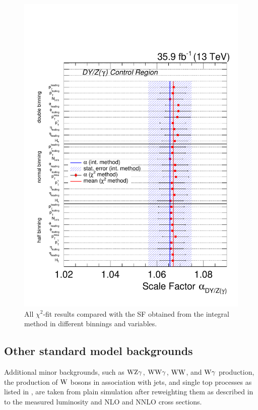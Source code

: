 \begin{figure}[tbp]
 \centering
 \includegraphics[width=\pairwidth]{figures/plots_CR/chi/DY_CompareLL}
 \caption{All $\chi^2$-fit results compared with the SF obtained from the integral method in different binnings and variables.}
 \label{fig:chiDY}
\end{figure}



\subsection{Other standard model backgrounds}
Additional minor backgrounds, such as $\mathrm{W}\mathrm{Z}\gamma$, $\mathrm{W}\mathrm{W}\gamma$, $\mathrm{W}\mathrm{W}$, and $\mathrm{W}\gamma$ production, the production of $\mathrm{W}$ bosons in association with jets, and single top processes as listed in , are taken from plain simulation after reweighting them as described in  to the measured luminosity and NLO and NNLO cross sections.

